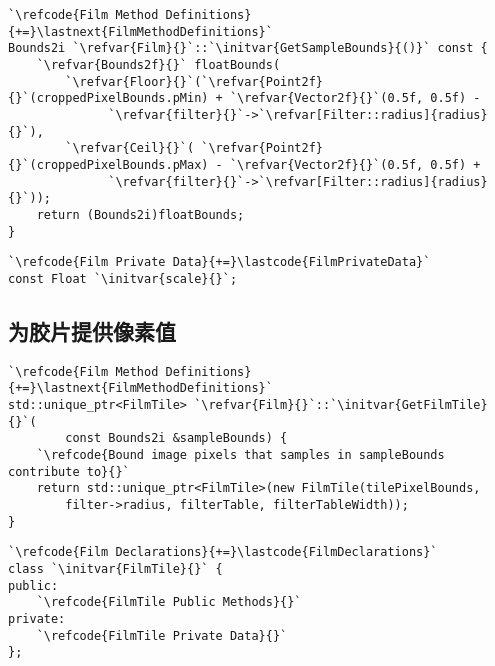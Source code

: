\begin{lstlisting}
`\refcode{Film Method Definitions}{+=}\lastnext{FilmMethodDefinitions}`
Bounds2i `\refvar{Film}{}`::`\initvar{GetSampleBounds}{()}` const {
    `\refvar{Bounds2f}{}` floatBounds(
        `\refvar{Floor}{}`(`\refvar{Point2f}{}`(croppedPixelBounds.pMin) + `\refvar{Vector2f}{}`(0.5f, 0.5f) -
              `\refvar{filter}{}`->`\refvar[Filter::radius]{radius}{}`),
        `\refvar{Ceil}{}`( `\refvar{Point2f}{}`(croppedPixelBounds.pMax) - `\refvar{Vector2f}{}`(0.5f, 0.5f) +
              `\refvar{filter}{}`->`\refvar[Filter::radius]{radius}{}`));
    return (Bounds2i)floatBounds;
}
\end{lstlisting}

\begin{lstlisting}
`\refcode{Film Private Data}{+=}\lastcode{FilmPrivateData}`
const Float `\initvar{scale}{}`;
\end{lstlisting}

\subsection{为胶片提供像素值}\label{sub:为胶片提供像素值}
\begin{lstlisting}
`\refcode{Film Method Definitions}{+=}\lastnext{FilmMethodDefinitions}`
std::unique_ptr<FilmTile> `\refvar{Film}{}`::`\initvar{GetFilmTile}{}`(
        const Bounds2i &sampleBounds) {
    `\refcode{Bound image pixels that samples in sampleBounds contribute to}{}`
    return std::unique_ptr<FilmTile>(new FilmTile(tilePixelBounds,
        filter->radius, filterTable, filterTableWidth));
}
\end{lstlisting}

\begin{lstlisting}
`\refcode{Film Declarations}{+=}\lastcode{FilmDeclarations}`
class `\initvar{FilmTile}{}` {
public:
    `\refcode{FilmTile Public Methods}{}`
private:
    `\refcode{FilmTile Private Data}{}`
};
\end{lstlisting}